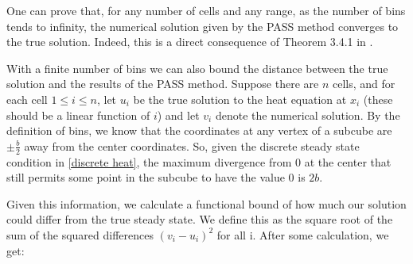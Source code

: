 \documentclass[11pt]{article}
\begin{document}
One can prove that, for any number of cells and any range, as the number of bins tends to infinity, the numerical solution given by the PASS method converges to the true solution. Indeed, this is a direct consequence of Theorem 3.4.1 in \citep{Introduction_to_PA}.
%
%
%
%

With a finite number of bins we can also bound the distance between the true solution and the results of the PASS method. Suppose there are $n$ cells, and for each cell $1\leq i\leq n$, let $u_i$ be the true solution to the heat equation at $x_i$ (these should be a linear function of $i$) and let $v_i$ denote the numerical solution. By the definition of bins, we know that the coordinates at any vertex of a subcube are $\pm \frac{b}{2}$ away from the center coordinates. So, given the discrete steady state condition in \cref{discrete heat}, the maximum divergence from 0 at the center that still permits some point in the subcube to have the value 0 is $2b$.

Given this information, we calculate a functional bound of how much our solution could differ from the true steady state. We define this as the square root of the sum of the squared differences $(v_i-u_i)^2$ for all i. After some calculation, we get:
\end{document}
